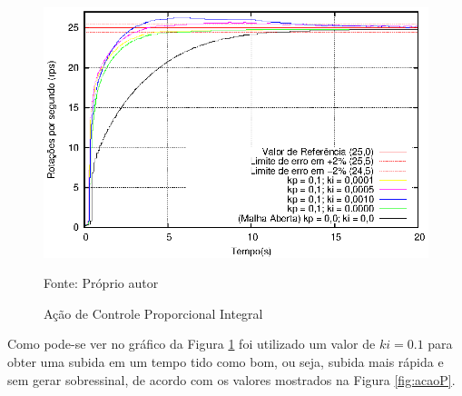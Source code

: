 






\begin{figure}[!htb]
\caption{Ação de Controle Proporcional Integral}
\center\includegraphics[scale=1.2]{./imagens/acaoPI.eps}
\label{fig:acaoPI}

{\small Fonte: Próprio autor}
\end{figure}

Como pode-se ver no gráfico da Figura \ref{fig:acaoPI} foi utilizado um valor de $ki = 0.1$ para obter uma subida em um tempo tido como bom, ou seja, subida mais rápida e sem gerar sobressinal, de acordo com os valores mostrados na Figura \ref{fig:acaoP}.








